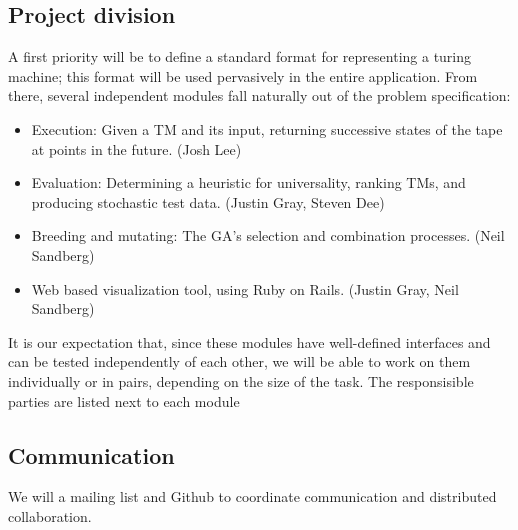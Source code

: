 \subsection{Project division}

A first priority will be to define a standard format for representing a turing machine; this format will be used pervasively in the entire application. From there, several independent modules fall naturally out of the problem specification:

\begin{itemize}
\item Execution: Given a TM and its input, returning successive states of the tape at points in the future. (Josh Lee)
\item Evaluation: Determining a heuristic for universality, ranking TMs, and producing stochastic test data. (Justin Gray, Steven Dee)
\item Breeding and mutating: The GA's selection and combination processes. (Neil Sandberg)
\item Web based visualization tool, using Ruby on Rails. (Justin Gray, Neil Sandberg)
\end{itemize}

It is our expectation that, since these modules have well-defined interfaces and can be tested independently of each other, we will be able to work on them individually or in pairs, depending on the size of the task. The responsisible parties are listed next to each module

\subsection{Communication}

We will a mailing list and Github to coordinate communication and distributed collaboration.
